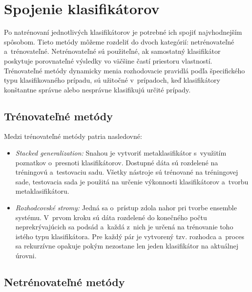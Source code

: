 \section{Spojenie klasifikátorov}

Po natrénovaní jednotlivých klasifikátorov je potrebné ich spojiť najvhodnejším spôsobom. Tieto metódy môžeme rozdeliť do dvoch kategórií: netrénovateľné a~trénovateľné. Netrénovateľné sú použiteľné, ak samostatný klasifikátor poskytuje porovnateľné výsledky vo väčšine častí priestoru vlastností. Trénovateľné metódy dynamicky menia rozhodovacie pravidlá podľa špecifického typu klasifikovaného prípadu, sú užitočné v~prípadoch, keď klasifikátory konštantne správne alebo nesprávne klasifikujú určité prípady.

\subsection{Trénovateľné metódy}
Medzi trénovateľné metódy patria nasledovné:
\begin{itemize}
	\item \textit{Stacked generalization:} Snahou je vytvoriť metaklasifikátor s~využitím poznatkov o~presnoti klasifikátorov. Dostupné dáta sú rozdelené na tréningovú a~testovaciu sadu. Všetky nástroje sú trénované na tréningovej sade, testovacia sada je použitá na určenie výkonnosti klasifikátorov a~tvorbu metaklasifikátoru.
	\item \textit{Rozhodcovské stromy:} Jedná sa o~prístup zdola nahor pri tvorbe ensemble systému. V~prvom kroku sú dáta rozdelené do konečného počtu neprekrývajúcich sa podsád a~každá z~nich je určená na trénovanie toho istého typu klasifikátora. Pre každý pár je vytvorený tzv. rozhodca a~proces sa rekurzívne opakuje pokým nezostane len jeden klasifikátor na aktuálnej úrovni. 
\end{itemize}

\subsection{Netrénovateľné metódy}

